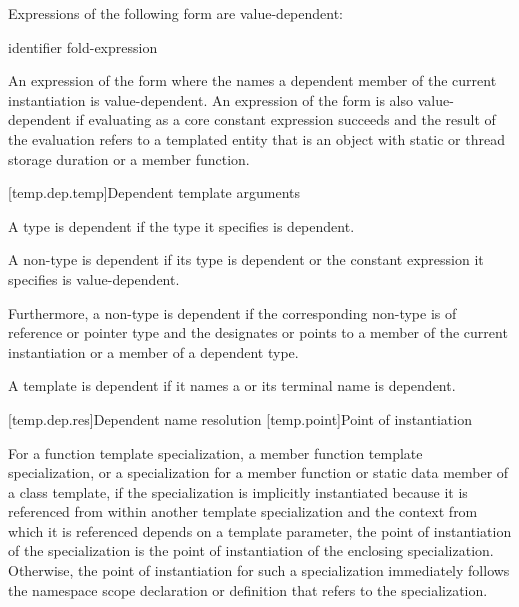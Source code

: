\pnum
Expressions of the following form are value-dependent:

\begin{ncsimplebnf}
  \terminal{(} identifier \terminal{)}\br
fold-expression
\end{ncsimplebnf}

\pnum
An expression of the form \tcode{\&} where the
 names a dependent member of the current
instantiation is value-dependent.
An expression of the form \tcode{\&}
is also value-dependent if evaluating 
as a core constant expression succeeds and
the result of the evaluation refers to a templated entity
that is an object with static or thread storage duration or a member function.

[temp.dep.temp]{Dependent template arguments}

\pnum
A type
is dependent if the type it specifies is dependent.

\pnum
A non-type
is dependent if its type is dependent or the constant
expression it specifies is value-dependent.

\pnum
Furthermore, a non-type
is dependent if the corresponding non-type 
is of reference or pointer type and the 
designates or points to a member of the current instantiation or a member of
a dependent type.

\pnum
A template  is dependent if
it names a  or
its terminal name is dependent.

[temp.dep.res]{Dependent name resolution}
[temp.point]{Point of instantiation}

\pnum
{}%
For a function template specialization, a member function template
specialization, or a specialization for a member function or static data member
of a class template,
if the specialization is implicitly instantiated because it is referenced
from within another template specialization and
the context from which it is referenced depends on a template parameter,
the point of instantiation of the specialization is the point of instantiation
of the enclosing specialization.
Otherwise, the point of instantiation for such a specialization immediately
follows the namespace scope declaration
or definition that refers to the specialization.


